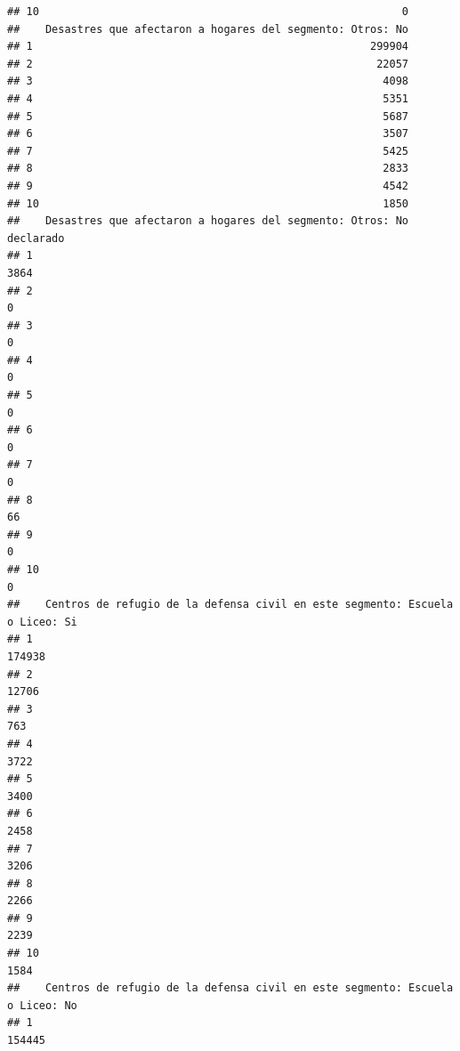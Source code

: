 \documentclass[11pt,]{article}
\begin{document}
\begin{verbatim}
## 10                                                         0
##    Desastres que afectaron a hogares del segmento: Otros: No
## 1                                                     299904
## 2                                                      22057
## 3                                                       4098
## 4                                                       5351
## 5                                                       5687
## 6                                                       3507
## 7                                                       5425
## 8                                                       2833
## 9                                                       4542
## 10                                                      1850
##    Desastres que afectaron a hogares del segmento: Otros: No declarado
## 1                                                                 3864
## 2                                                                    0
## 3                                                                    0
## 4                                                                    0
## 5                                                                    0
## 6                                                                    0
## 7                                                                    0
## 8                                                                   66
## 9                                                                    0
## 10                                                                   0
##    Centros de refugio de la defensa civil en este segmento: Escuela o Liceo: Si
## 1                                                                        174938
## 2                                                                         12706
## 3                                                                           763
## 4                                                                          3722
## 5                                                                          3400
## 6                                                                          2458
## 7                                                                          3206
## 8                                                                          2266
## 9                                                                          2239
## 10                                                                         1584
##    Centros de refugio de la defensa civil en este segmento: Escuela o Liceo: No
## 1                                                                        154445

\end{verbatim}
\end{document}

